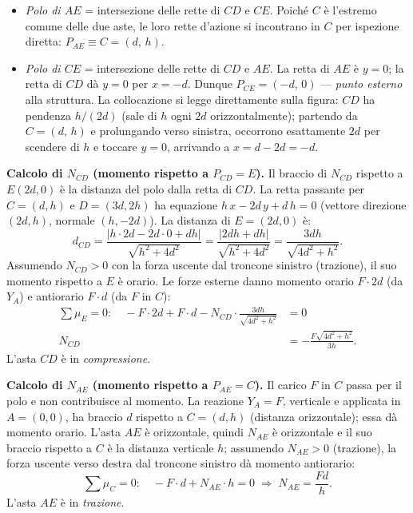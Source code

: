 \begin{esempio}
\begin{svolgimento}
\begin{itemize}[noitemsep]
			\item \emph{Polo di $AE$} = intersezione delle
			rette di $CD$ e $CE$. Poiché $C$ è l'estremo
			comune delle due aste, le loro rette d'azione
			si incontrano in $C$ per ispezione diretta:
			$P_{AE} \equiv C = (d,\,h)$.
			
			\item \emph{Polo di $CE$} = intersezione
			delle rette di $CD$ e $AE$.
			La retta di $AE$ è $y = 0$; la retta di $CD$
			dà $y = 0$ per $x = -d$. Dunque
			$P_{CE} = (-d,\,0)$ --- \emph{punto esterno}
			alla struttura.
			La collocazione si legge direttamente sulla figura:
			$CD$ ha pendenza $h/(2d)$ (sale di $h$ ogni $2d$
			orizzontalmente); partendo da $C = (d,\,h)$ e
			prolungando verso sinistra, occorrono esattamente
			$2d$ per scendere di $h$ e toccare $y = 0$,
			arrivando a $x = d - 2d = -d$.
		\end{itemize}
		
		\noindent\textbf{Calcolo di $N_{CD}$
			(momento rispetto a $P_{CD} = E$).}
		Il braccio di $N_{CD}$ rispetto a $E(2d,0)$
		è la distanza del polo dalla retta di $CD$.
		La retta passante per $C=(d,h)$ e $D=(3d,2h)$
		ha equazione $h\,x - 2d\,y + d\,h = 0$
		(vettore direzione $(2d,h)$, normale $(h,-2d)$).
		La distanza di $E=(2d,0)$ è:
		\[
		d_{CD}
		= \frac{|h\cdot 2d - 2d\cdot 0 + dh|}{\sqrt{h^2+4d^2}}
		= \frac{|2dh+dh|}{\sqrt{h^2+4d^2}}
		= \frac{3dh}{\sqrt{4d^2+h^2}}.
		\]
		Assumendo $N_{CD} > 0$ con la forza uscente
		dal troncone sinistro (trazione), il suo momento
		rispetto a $E$ è orario. Le forze esterne
		danno momento orario $F \cdot 2d$ (da $Y_A$)
		e antiorario $F \cdot d$ (da $F$ in $C$):
		\begin{align*}
			\sum \mu_E = 0:\quad
			-F \cdot 2d + F \cdot d
			- N_{CD} \cdot \frac{3dh}{\sqrt{4d^2+h^2}}
			&= 0 \\
			N_{CD} &= -\frac{F\sqrt{4d^2+h^2}}{3h}.
		\end{align*}
		L'asta $CD$ è in \emph{compressione}.
		
		\noindent\textbf{Calcolo di $N_{AE}$
			(momento rispetto a $P_{AE} = C$).}
		Il carico $F$ in $C$ passa per il polo e non
		contribuisce al momento. La reazione $Y_A = F$,
		verticale e applicata in $A=(0,0)$, ha braccio $d$
		rispetto a $C=(d,h)$ (distanza orizzontale);
		essa dà momento orario. L'asta $AE$ è orizzontale,
		quindi $N_{AE}$ è orizzontale e il suo braccio
		rispetto a $C$ è la distanza verticale $h$;
		assumendo $N_{AE}>0$ (trazione), la forza uscente
		verso destra dal troncone sinistro dà momento
		antiorario:
		\[
		\sum \mu_C = 0:\quad
		-F \cdot d + N_{AE} \cdot h = 0
		\;\Rightarrow\;
		N_{AE} = \frac{Fd}{h}.
		\]
		L'asta $AE$ è in \emph{trazione}.
		

\end{svolgimento}
\end{esempio}
